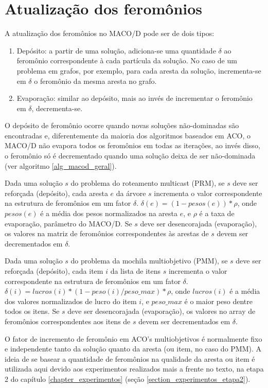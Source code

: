 \section{Atualização dos feromônios}

A atualização dos feromônios no MACO/D pode ser de dois tipos:

\begin{enumerate}
	\item Depósito: a partir de uma solução, adiciona-se uma quantidade $\delta$ ao feromônio correspondente à cada partícula da solução. No caso de um problema em grafos, por exemplo, para cada aresta da solução, incrementa-se em $\delta$ o feromônio da mesma aresta no grafo.
	\item Evaporação: similar ao depósito, mais ao invés de incrementar o feromônio em $\delta$, decrementa-se.
\end{enumerate}

O depósito de feromônio ocorre quando novas soluções não-dominadas são encontradas e, diferentemente da maioria dos algoritmos baseados em ACO, o MACO/D não evapora todos os feromônios em todas as iterações, ao invés disso, o feromônio só é decrementado quando uma solução deixa de ser não-dominada (ver algoritmo \ref{alg_macod_geral}).

Dada uma solução $s$ do problema do roteamento multicast (PRM), se $s$ deve ser reforçada (depósito), cada aresta $e$ da árvore $s$ incrementa o valor correspondente na estrutura de feromônios em um fator $\delta$. $\delta(e) = (1 - pesos(e)) * \rho$, onde $pesos(e)$ é a média dos pesos normalizados na aresta $e$, e $\rho$ é a taxa de evaporação, parâmetro do MACO/D. Se $s$ deve ser desencorajada (evaporação), os valores na matriz de feromônios correspondentes às arestas de $s$ devem ser decrementados em $\delta$.

Dada uma solução $s$ do problema da mochila multiobjetivo (PMM), se $s$ deve ser reforçada (depósito), cada item $i$ da lista de itens $s$ incrementa o valor correspondente na estrutura de feromônios em um fator $\delta$. $\delta(i) = lucros(i) * (1 - peso(i) / peso\_{max}) * \rho$, onde $lucros(i)$ é a média dos valores normalizados de lucro do item $i$, e $peso\_{max}$ é o maior peso dentre todos os itens. Se $s$ deve ser desencorajada (evaporação), os valores no array de feromônios correspondentes aos itens de $s$ devem ser decrementados em $\delta$.

O fator de incremento de feromônio em ACO's multiobjetivos é normalmente fixo e independente tanto da solução quanto da aresta (ou item, no caso do PMM). A ideia de se basear a quantidade de feromônios na qualidade da aresta ou item é utilizada aqui devido aos experimentos realizados mais a frente no texto, na etapa 2 do capítulo \ref{chapter_experimentos} (seção \ref{section_experimentos_etapa2}).